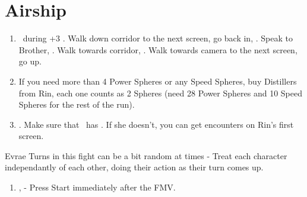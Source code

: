 \chapter{Airship}

\begin{enumerate}
    \item \sd\ during \cs+3 \skippablefmv. Walk down corridor to the next screen, go back in, \sd. Speak to Brother, \sd. Walk towards corridor, \sd. Walk towards camera to the next screen, go up.
    \item If you need more than 4 Power Spheres or any Speed Spheres, buy Distillers from Rin, each one counts as 2 Spheres (need 28 Power Spheres and 10 Speed Spheres for the rest of the run).
    \item \save. Make sure that \rikku\ has \od. If she doesn't, you can get encounters on Rin's first screen.
\end{enumerate}
\begin{battle}[32000]{Evrae}
    Turns in this fight can be a bit random at times - Treat each character independantly of each other, doing their action as their turn comes up.
    \begin{itemize}
    \end{itemize}
\end{battle}
\begin{enumerate}[resume]
    \item \sd, \skippablefmv[3:00] - Press Start immediately after the FMV.
\end{enumerate}